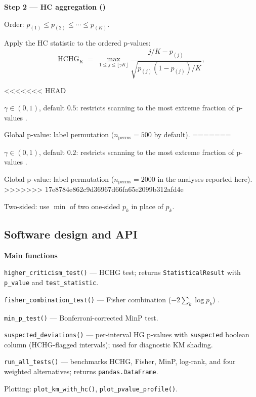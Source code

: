 \documentclass[unnumsec,webpdf,contemporary,large]{oup-authoring-template}
\let\origitemize\itemize
\let\origenditemize\enditemize
\renewenvironment{itemize}{%
  \origitemize
  \setlength{\itemsep}{1pt}%
  \setlength{\parskip}{0pt}%
  \setlength{\topsep}{3pt}%
}{\origenditemize}
\begin{document}
\textbf{Step 2 — HC aggregation (\citealt{donoho2004})}
\begin{itemize}
  \item Order: $p_{(1)} \leq p_{(2)} \leq \cdots \leq p_{(K)}$.
  \item Apply the HC statistic to the ordered p-values:
\end{itemize}
%
\begin{equation}\label{eq:hc}
  \mathrm{HCHG}_K
  \;=\;
  \max_{1 \leq j \leq \lfloor\gamma K\rfloor}
  \frac{j/K - p_{(j)}}{\sqrt{p_{(j)}\!\left(1 - p_{(j)}\right)/K}},
\end{equation}
%
\begin{itemize}
<<<<<<< HEAD
  \item $\gamma \in (0,1)$, default $0.5$: restricts scanning to the
        most extreme fraction of p-values \citep{donoho2015special}.
  \item Global p-value: label permutation ($n_\mathrm{perms}=500$
        by default).
=======
  \item $\gamma \in (0,1)$, default $0.2$: restricts scanning to the
        most extreme fraction of p-values \citep{donoho2004}.
  \item Global p-value: label permutation ($n_\mathrm{perms}=2000$
        in the analyses reported here).
>>>>>>> 17e8784e862c9d36967d66fa65e2099b312afd4e
  \item Two-sided: use $\min$ of two one-sided $p_k$ in place of $p_k$.
\end{itemize}


\subsection*{Software design and API}

\textbf{Main functions}
\begin{itemize}
  \item \texttt{higher\_criticism\_test()} — HCHG test; returns
        \texttt{StatisticalResult} with \texttt{p\_value} and
        \texttt{test\_statistic}.
  \item \texttt{fisher\_combination\_test()} — Fisher combination
        ($-2\sum_k \log p_k$) \citep{fisher1932}.
  \item \texttt{min\_p\_test()} — Bonferroni-corrected MinP test.
  \item \texttt{suspected\_deviations()} — per-interval HG p-values
        with \texttt{suspected} boolean column (HCHG-flagged intervals);
        used for diagnostic KM shading.
  \item \texttt{run\_all\_tests()} — benchmarks HCHG, Fisher, MinP,
        log-rank, and four weighted alternatives; returns
        \texttt{pandas.DataFrame}.
  \item Plotting: \texttt{plot\_km\_with\_hc()},
        \texttt{plot\_pvalue\_profile()}.
\end{itemize}
\end{document}
